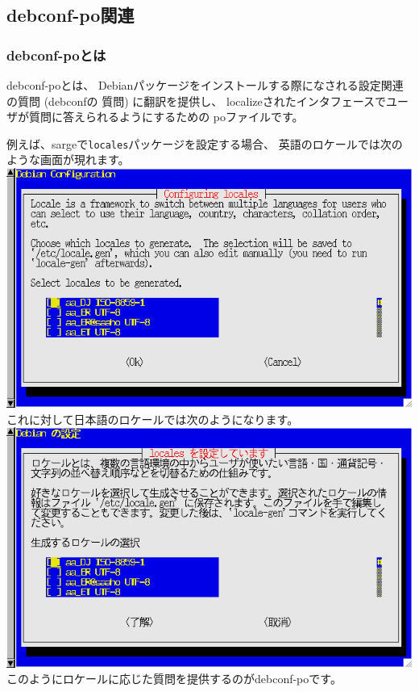 \documentclass[mingoth,a4paper]{jsarticle}
\begin{document}
\subsection{debconf-po関連}

\subsubsection{debconf-poとは}

debconf-poとは、
Debianパッケージをインストールする際になされる設定関連の質問 (debconfの
質問) に翻訳を提供し、
localizeされたインタフェースでユーザが質問に答えられるようにするための
poファイルです。

例えば、sargeで\texttt{locales}パッケージを設定する場合、
英語のロケールでは次のような画面が現れます。\\
\includegraphics[width=1\hsize]{image200609/debconf-en.png}\\
これに対して日本語のロケールでは次のようになります。\\
\includegraphics[width=1\hsize]{image200609/debconf-ja.png}\\
このようにロケールに応じた質問を提供するのがdebconf-poです。
\end{document}
